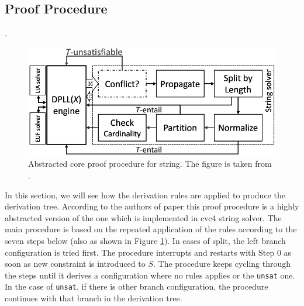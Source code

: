 \subsection{Proof Procedure}.  
   
   \begin{figure}[htb]
    \centering
		\includegraphics[width=0.7\linewidth]{pictures/proof_procedure.png}
	\caption{Abstracted core proof procedure for string. The figure is taken from \cite{main_phd}.}
	\label{fig:proof_procedure}
	\end{figure}
	
	
	In this section, we will see how the derivation rules are applied to produce the derivation tree. According to the authors of paper \cite{main-paper} this proof procedure is a highly abstracted version of the one which is implemented in cvc4 string solver. The main procedure is based on the repeated application of the rules according to the seven steps below (also as shown in Figure \ref{fig:proof_procedure}). In cases of split, the left branch configuration is tried first. The procedure interrupts and restarts with Step 0 as soon as new constraint is introduced to $S$. The procedure keeps cycling through the steps until it derives a configuration where no rules applies or the \texttt{unsat} one. In the case of \texttt{unsat}, if there is other branch configuration, the procedure continues with that branch in the derivation tree.

